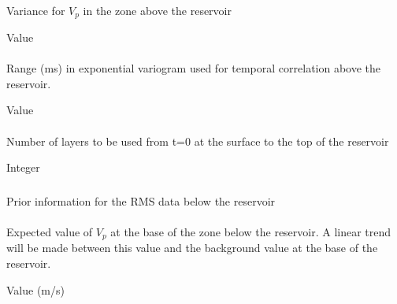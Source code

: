 {\paragraph{}
 \slist
   \item \Description Variance for $V_p$ in the zone above the reservoir
   \item \Argument Value
   \item \Default
 \elist

\paragraph{}
 \slist
   \item \Description Range (ms) in exponential variogram used for temporal correlation above the reservoir. 
   \item \Argument Value
   \item \Default
 \elist

\paragraph{}
 \slist
   \item \Description Number of layers to be used from t=0 at the surface to the top of the reservoir
   \item \Argument Integer
   \item \Default
 \elist

\subsubsection{}
 \slist
   \item \Description Prior information for the RMS data below the reservoir
   \item \Argument
   \item \Default
 \elist

\paragraph{}
 \slist
   \item \Description Expected value of $V_p$ at the base of the zone below the reservoir. A linear trend will be made between this value and the background value at the base of the reservoir. 
   \item \Argument Value (m/s)
   \item \Default
 \elist

}
